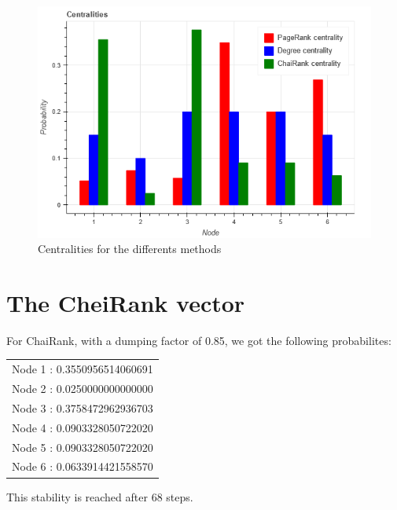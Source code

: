 \documentclass[12pt]{article}
\begin{document}
\begin{figure}[ht]
    \centering
    \includegraphics[width=\textwidth]{images/centralities.png}
    \caption{Centralities for the differents methods}
    \label{fig:centralitiesl}
\end{figure}

\section{The CheiRank vector}

For ChaiRank, with a dumping factor of 0.85, we got the following probabilites:

\begin{center}
\begin{tabular}{c}
Node 1 : 0.3550956514060691\\
Node 2 : 0.0250000000000000\\
Node 3 : 0.3758472962936703\\
Node 4 : 0.0903328050722020\\
Node 5 : 0.0903328050722020\\
Node 6 : 0.0633914421558570
\end{tabular}
\end{center}

This stability is reached after 68 steps.\\
\end{document}
